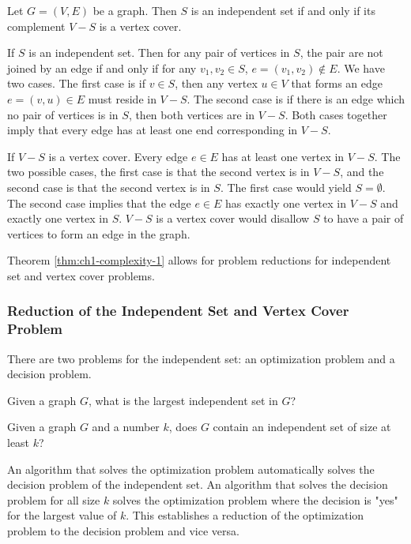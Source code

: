 \begin{thm}\label{thm:ch1-complexity-1}
Let $G = (V,E)$ be a graph.  Then $S$ is an independent set if and only if its complement $V-S$ is a 
vertex cover.
\end{thm}
\begin{pf}
If $S$ is an independent set. Then for any pair of vertices in $S$, the pair are not joined by an 
edge if and only if for any $v_1, v_2 \in S$, $e = \left( v_1, v_2 \right) \not \in E$.  We have two 
cases.  The first case is if $v \in S$, then any vertex $u \in V$ that forms an edge $e = (v,u) \in 
E$ must reside in $V-S$. The second case is if there is an edge which no pair of vertices is in $S$, 
then both vertices are in $V-S$.  Both cases together imply that every edge has at least one end 
corresponding in $V-S$. 


If $V-S$ is a vertex cover.  Every edge $e \in E$ has at least one vertex in $V-S$.  The two 
possible cases, the first case is that the second vertex is in $V-S$, and the second case is that 
the second vertex is in $S$.  The first case would yield $S = \emptyset$.  The second case implies 
that the edge $e \in E$ has exactly one vertex in $V-S$ and exactly one vertex in $S$.  $V-S$ is a 
vertex cover would disallow $S$ to have a pair of vertices to form an edge in the graph.
\end{pf}
Theorem \ref{thm:ch1-complexity-1} allows for problem reductions for independent set and vertex 
cover problems.

\subsubsection{Reduction of the Independent Set and Vertex Cover Problem}
There are two problems for the independent set: an optimization problem and a decision problem.
\begin{prob}
Given a graph $G$, what is the largest independent set in $G$?
\end{prob}
\begin{prob}
Given a graph $G$ and a number $k$, does $G$ contain an independent set of size at least $k$?
\end{prob}
An algorithm that solves the optimization problem automatically solves the decision problem of the 
independent set.  An algorithm that solves the decision problem for all size $k$ solves the 
optimization problem where the decision is "yes" for the largest value of $k$.  This establishes a 
reduction of the optimization problem to the decision problem and vice versa. 



